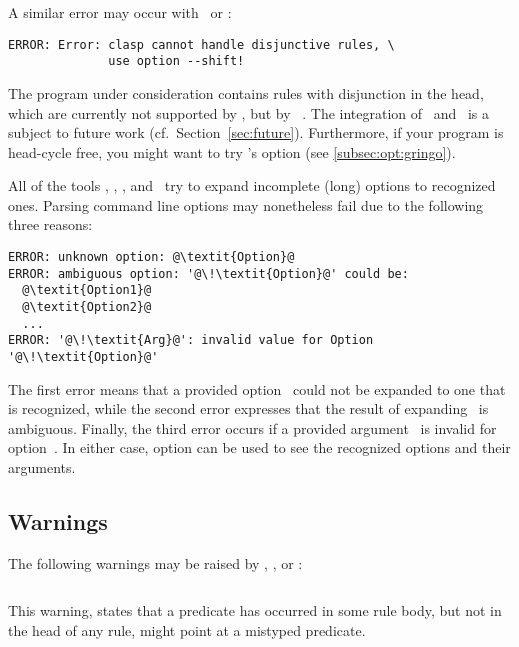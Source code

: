 A similar error may occur with \clingo\ or \iclingo:
%
\begin{lstlisting}[numbers=none,escapechar=@]
ERROR: Error: clasp cannot handle disjunctive rules, \
              use option --shift!
\end{lstlisting}
%
The program under consideration contains rules with disjunction in the head,
which are currently not supported by \clasp,
but by \claspD~\cite{drgegrkakoossc08a}.
The integration of \clasp\ and \claspD\ is a subject to future work
(cf.\ Section~\ref{sec:future}).
Furthermore, if your program is head-cycle free, 
you might want to try \gringo's  option (see \ref{subsec:opt:gringo}).

All of the tools \gringo, \clasp, \clingo, and \iclingo\
try to expand incomplete (long) options to recognized ones.
Parsing command line options may nonetheless fail due to the following three reasons:
%
\begin{lstlisting}[numbers=none,escapechar=@]
ERROR: unknown option: @\textit{Option}@
ERROR: ambiguous option: '@\!\textit{Option}@' could be:
  @\textit{Option1}@
  @\textit{Option2}@
  ...
ERROR: '@\!\textit{Arg}@': invalid value for Option '@\!\textit{Option}@'
\end{lstlisting}
%
The first error means that a provided option~
could not be expanded to one that is recognized,
while the second error expresses that the result of expanding~
is ambiguous.
Finally, the third error occurs if a provided argument~\code{\textit{Arg}}
is invalid for option~.
In either case, option \code{--help} can be used to see 
the recognized options and their arguments.


\subsection{Warnings}\label{subsec:warn}

The following warnings may be raised by \gringo, \clingo, or \iclingo:
%
\begin{lstlisting}[numbers=none,escapechar=@]
% warning: @\textit{p}@/@\!\textit{i}@ is never defined
\end{lstlisting}
%
This warning, states that a predicate 
has occurred in some rule body, but not in the head of any rule,
might point at a mistyped predicate.

